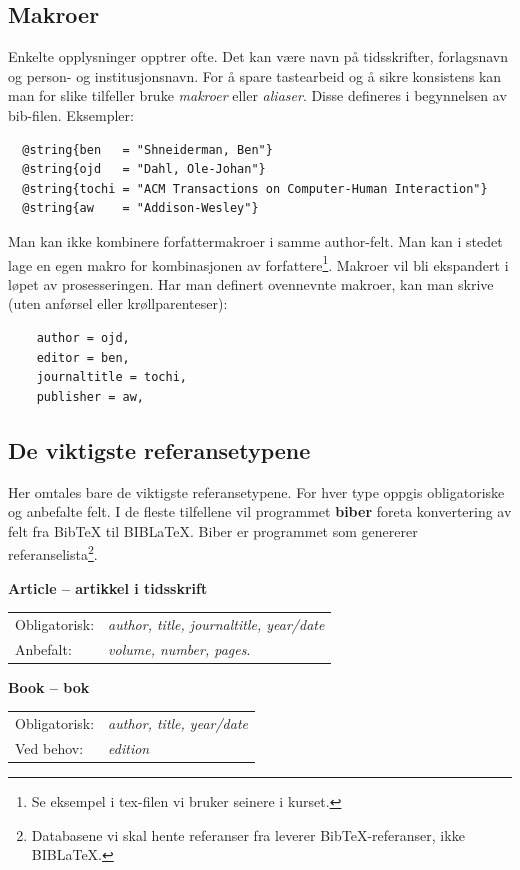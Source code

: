 \documentclass[11pt,norsk,a4paper]{article}
\newcommand{\bt}{BibTeX{}}
\newcommand{\blt}{B{\smaller[2]IB}\discretionary{-}{}{\kern
    -0.12em}\LaTeX{}}
\newcommand{\underskrift}[1]{\vspace{.2cm}\noindent\textbf{#1}\newline}
\newcommand{\mnd}{Obligatorisk}
\begin{document}
\subsection{Makroer\label{makroer}}
Enkelte opplysninger opptrer ofte. Det kan være navn på tidsskrifter,
forlagsnavn og person- og institusjonsnavn. For å spare tastearbeid og
å sikre konsistens kan man for slike tilfeller bruke
\textit{makroer} eller \textit{aliaser}. Disse defineres i begynnelsen av
bib-filen. Eksempler:

{\footnotesize
\begin{verbatim}
  @string{ben   = "Shneiderman, Ben"}
  @string{ojd   = "Dahl, Ole-Johan"}
  @string{tochi = "ACM Transactions on Computer-Human Interaction"}
  @string{aw    = "Addison-Wesley"}
\end{verbatim}
}

\noindent{}Man kan ikke kombinere forfattermakroer i samme author-felt. 
Man kan i stedet lage en egen makro for kombinasjonen av forfattere\footnote{Se eksempel 
i tex-filen vi bruker seinere i kurset.}. Makroer vil bli ekspandert i løpet av prosesseringen. 
Har man definert ovennevnte makroer, kan man skrive (uten anførsel eller krøllparenteser):
{\footnotesize\begin{verbatim}
    author = ojd,
    editor = ben,
    journaltitle = tochi,
    publisher = aw,
\end{verbatim}}

\subsection{De viktigste referansetypene}\label{bibtextyper}

Her omtales bare de viktigste referansetypene. For hver type oppgis
obligatoriske og anbefalte felt. I de fleste tilfellene vil programmet \textbf{biber} foreta
konvertering av felt fra \bt{} til \blt. Biber er programmet som
genererer referanselista\footnote{Databasene vi skal hente referanser
  fra leverer \bt-referanser, ikke \blt.}.

\underskrift{Article -- artikkel i tidsskrift}
\indent\begin{tabular}{ll}
\mnd:&\textit{author, title, journaltitle, year/date}\\
Anbefalt:& \textit{volume, number, pages}.\\ 
\end{tabular}

\underskrift{Book -- bok}
\indent\begin{tabular}{ll}
\mnd:&\textit{author, title, year/date}\\
Ved behov: &\textit{edition}\\
\end{tabular}
\end{document}
